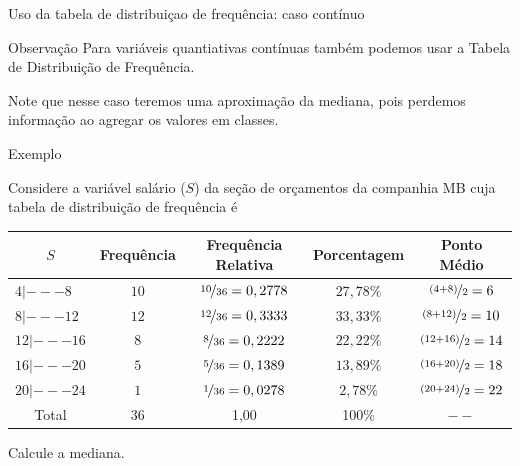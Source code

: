 \documentclass[8pt]{beamer}
\begin{document}
\begin{frame}{Uso da tabela de distribuiçao de frequência: caso contínuo}


\begin{block}{Observação}
  Para variáveis quantiativas contínuas também podemos usar a Tabela de Distribuição de Frequência. 
  
  Note que nesse caso teremos uma {\color{red} aproximação} da mediana, pois perdemos informação ao agregar os valores 
  em classes.
 \end{block}

 \begin{block}{Exemplo}
 
 Considere a variável salário ($S$) da seção de orçamentos da companhia MB cuja tabela de distribuição de frequência é 
   \begin{table}
   \centering
   \begin{tabular}{l|ccc|c}
    \toprule[0.05cm]
    \multicolumn{1}{c|}{$S$} & Frequência & Frequência Relativa & Porcentagem & Ponto Médio \\ \midrule[0.05cm]
    $4 |--- 8$ & $10$ & $\nicefrac{10}{36}=0,2778$ & $27,78 \%$ & $\nicefrac{(4+8)}{2} = 6$ \\
    $8 |--- 12$ & $12$ & $\nicefrac{12}{36}=0,3333$ & $33,33 \%$ & $\nicefrac{(8+12)}{2} = 10$\\
    $12 |--- 16$ & $8$ & $\nicefrac{8}{36}=0,2222$ & $22,22 \%$ &  $\nicefrac{(12+16)}{2} = 14$\\
    $16 |--- 20$ & $5$ & $\nicefrac{5}{36}=0,1389$ & $13,89 \%$ & $\nicefrac{(16+20)}{2} = 18$\\
    $20 |--- 24$ & $1$ & $\nicefrac{1}{36}=0,0278$ & $2,78 \%$ & $\nicefrac{(20+24)}{2} =22$\\ \midrule[0.05cm]
    \multicolumn{1}{c|}{Total} & 36 & 1,00 & 100\% & $--$ \\ \bottomrule[0.05cm]
   \end{tabular}
  \end{table}
  Calcule a mediana. 
  \end{block}
\end{frame}
\end{document}
